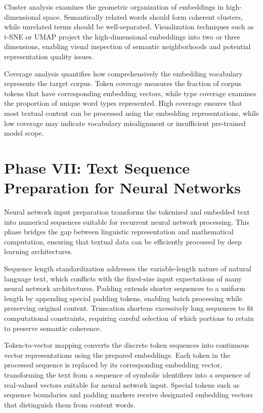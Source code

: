 \documentclass[11pt,a4paper]{article}
\begin{document}
Cluster analysis examines the geometric organization of embeddings in high-dimensional space. Semantically related words should form coherent clusters, while unrelated terms should be well-separated. Visualization techniques such as t-SNE or UMAP project the high-dimensional embeddings into two or three dimensions, enabling visual inspection of semantic neighborhoods and potential representation quality issues.

Coverage analysis quantifies how comprehensively the embedding vocabulary represents the target corpus. Token coverage measures the fraction of corpus tokens that have corresponding embedding vectors, while type coverage examines the proportion of unique word types represented. High coverage ensures that most textual content can be processed using the embedding representations, while low coverage may indicate vocabulary misalignment or insufficient pre-trained model scope.

\section{Phase VII: Text Sequence Preparation for Neural Networks}

Neural network input preparation transforms the tokenized and embedded text into numerical sequences suitable for recurrent neural network processing. This phase bridges the gap between linguistic representation and mathematical computation, ensuring that textual data can be efficiently processed by deep learning architectures.

Sequence length standardization addresses the variable-length nature of natural language text, which conflicts with the fixed-size input expectations of many neural network architectures. Padding extends shorter sequences to a uniform length by appending special padding tokens, enabling batch processing while preserving original content. Truncation shortens excessively long sequences to fit computational constraints, requiring careful selection of which portions to retain to preserve semantic coherence.

Token-to-vector mapping converts the discrete token sequences into continuous vector representations using the prepared embeddings. Each token in the processed sequence is replaced by its corresponding embedding vector, transforming the text from a sequence of symbolic identifiers into a sequence of real-valued vectors suitable for neural network input. Special tokens such as sequence boundaries and padding markers receive designated embedding vectors that distinguish them from content words.
\end{document}

